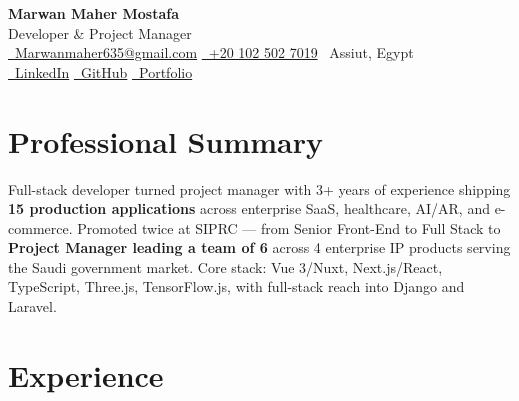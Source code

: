 \documentclass[10pt, letterpaper]{article}
\newenvironment{header}{
    \centering\linespread{1.5}
}{
    \par\kern\topsep
}
\begin{document}
\begin{header}
    {\LARGE \textbf{Marwan Maher Mostafa}} \\[2pt]
    {\small Developer \& Project Manager} \\[4pt]
    \href{mailto:Marwanmaher635@gmail.com}{\faEnvelope\ Marwanmaher635@gmail.com} \textbar{}
    \href{tel:+201025027019}{\faPhone\ +20 102 502 7019} \textbar{}
    \faMapMarker*\ Assiut, Egypt \\[3pt]
    \href{https://www.linkedin.com/in/marwan-maher-b11628227}{\faLinkedin\ LinkedIn} \textbar{}
    \href{https://github.com/MarwanMaher0}{\faGithub\ GitHub} \textbar{}
    \href{https://marwanmaher0.github.io}{\faGlobe\ Portfolio}
\end{header}

\vspace{0.2cm}

\section{Professional Summary}
Full-stack developer turned project manager with 3+ years of experience shipping \textbf{15 production applications} across enterprise SaaS, healthcare, AI/AR, and e-commerce. Promoted twice at SIPRC — from Senior Front-End to Full Stack to \textbf{Project Manager leading a team of 6} across 4 enterprise IP products serving the Saudi government market. Core stack: Vue 3/Nuxt, Next.js/React, TypeScript, Three.js, TensorFlow.js, with full-stack reach into Django and Laravel.

\section{Experience}
\end{document}
